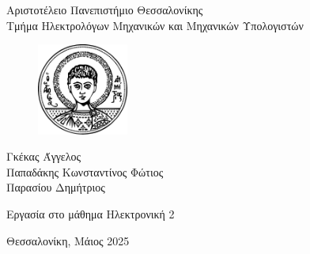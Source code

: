 \documentclass[11pt,a4paper,twoside,onecolumn,openright,final]{memoir}
\begin{document}
\thispagestyle{empty}
{\centering\Large

\vspace{\fill}

{\Large Αριστοτέλειο Πανεπιστήμιο Θεσσαλονίκης\\
Τμήμα Ηλεκτρολόγων Μηχανικών και Μηχανικών Υπολογιστών}\\[0.5cm]

\begin{figure}[h]
\centerfloat%
\includegraphics[width=3.0cm]{figures/logo_auth.png}
\end{figure}
\vspace{2.0cm}

{\LARGE Γκέκας Άγγελος  \\
Παπαδάκης Κωνσταντίνος Φώτιος  \\
Παρασίου Δημήτριος }

\vspace{3.5cm}


{\Huge Εργασία στο μάθημα Ηλεκτρονική 2}

\vspace{3.5cm}


\vspace{\fill}

Θεσσαλονίκη, Μάιος 2025

}


\let\cleardoublepage\clearpage
\frontmatter


\renewcommand*\contentsname{Περιεχόμενα}
\tableofcontents*

\renewcommand*\listfigurename{Κατάλογος Σχημάτων}
\listoffigures*

\renewcommand*\chaptername{Κεφάλαιο}
\renewcommand*\figurename{Σχήμα}
\renewcommand{\tablename}{Πίνακας}
\end{document}
